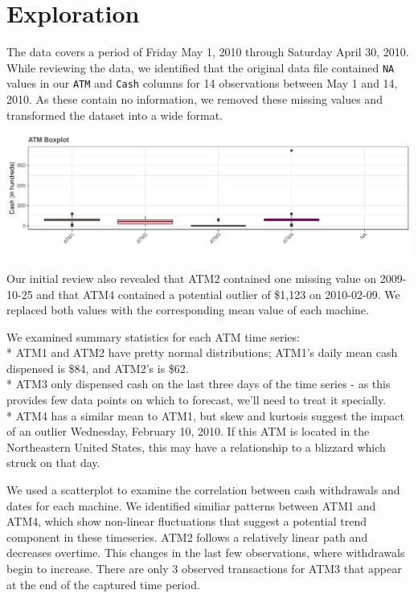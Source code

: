 \documentclass[openany]{book}
\begin{document}
\hypertarget{exploration}{%
\section{Exploration}\label{exploration}}

The data covers a period of Friday May 1, 2010 through Saturday April
30, 2010. While reviewing the data, we identified that the original data
file contained \texttt{NA} values in our \texttt{ATM} and \texttt{Cash}
columns for 14 observations between May 1 and 14, 2010. As these contain
no information, we removed these missing values and transformed the
dataset into a wide format.

\includegraphics{Part-A-JM_JO_files/figure-latex/unnamed-chunk-2-1.pdf}

Our initial review also revealed that ATM2 contained one missing value
on 2009-10-25 and that ATM4 contained a potential outlier of \$1,123 on
2010-02-09. We replaced both values with the corresponding mean value of
each machine.

We examined summary statistics for each ATM time series:\\
* ATM1 and ATM2 have pretty normal distributions; ATM1's daily mean cash
dispensed is \$84, and ATM2's is \$62.\\
* ATM3 only dispensed cash on the last three days of the time series -
as this provides few data points on which to forecast, we'll need to
treat it specially.\\
* ATM4 has a similar mean to ATM1, but skew and kurtosis suggest the
impact of an outlier Wednesday, February 10, 2010. If this ATM is
located in the Northeastern United States, this may have a relationship
to a blizzard which struck on that day.

We used a scatterplot to examine the correlation between cash
withdrawals and dates for each machine. We identified similiar patterns
between ATM1 and ATM4, which show non-linear fluctuations that suggest a
potential trend component in these timeseries. ATM2 follows a relatively
linear path and decreases overtime. This changes in the last few
observations, where withdrawals begin to increase. There are only 3
observed transactions for ATM3 that appear at the end of the captured
time period.
\end{document}
